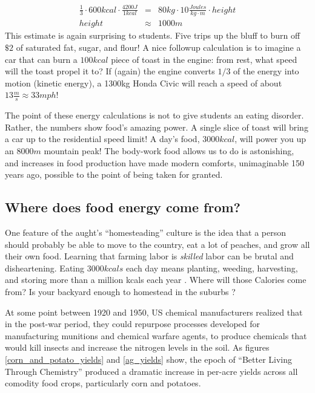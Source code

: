 \documentclass[12pt]{iopart}
\newcommand{\bea}{\begin{eqnarray}}
\newcommand{\eea}{\end{eqnarray}}
\begin{document}
\bea
\frac{1}{3}\cdot600kcal\cdot\frac{4200J}{1kcal} 
	&=& 80kg\cdot10\frac{Joules}{kg\cdot m}\cdot height \label{eq:bar_chart}\\
height &\approx&  1000 m
\eea
This estimate is again surprising to students.  Five trips up the bluff to burn off $\$2$ of saturated fat, sugar, and flour!  A nice followup calculation is to imagine a car that can burn a $100kcal$ piece of toast in the engine: from rest, what speed will the toast propel it to? If (again) the engine converts $1/3$ of the energy into motion (kinetic energy), a 1300kg Honda Civic will reach a speed of about $13\frac{m}{s}\approx33mph$!  

The point of these energy calculations is not to give students an eating disorder.  Rather, the numbers show food's amazing power. A single slice of toast will bring a car up to the residential speed limit!  A day's food, $3000kcal$, will power you up an $8000m$ mountain peak! The body-work food allows us to do is astonishing, and increases in food production have made modern  comforts, unimaginable 150 years ago, possible to the point of being taken for granted.  

\subsection{Where does food energy come from?}
One feature of the aught's ``homesteading'' culture \cite{homesteading} is the idea that a person should probably be able to move to the country, eat a lot of peaches, and grow all their own food.  Learning that farming labor is \textit{skilled} labor can be brutal and disheartening. Eating $3000kcals$ each day means planting, weeding, harvesting, and storing more than a million kcals each year \cite{Haspel}.  Where will those Calories come from? Is your backyard enough to homestead in the suburbs \cite{backyard_homestead}?

At some point between 1920 and 1950, US chemical manufacturers realized that in the post-war period, they could repurpose processes developed for manufacturing munitions and chemical warfare agents, to produce chemicals that would kill insects and increase the nitrogen levels in the soil. 
As figures \ref{corn_and_potato_yields} and \ref{ag_yields} show, the epoch of ``Better Living Through Chemistry'' produced a dramatic increase in per-acre yields across all comodity food crops, particularly corn and potatoes.  
\end{document}
